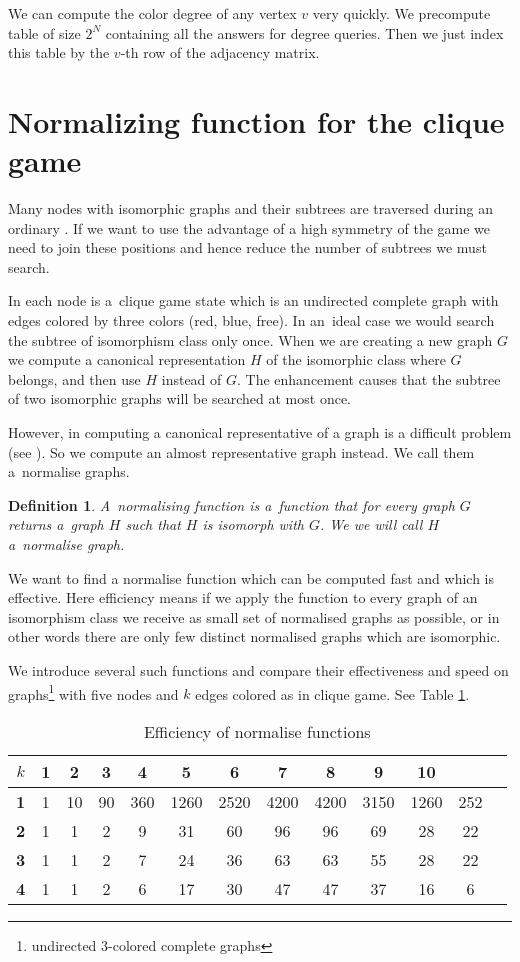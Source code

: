 We can compute the color degree of any vertex $v$ very quickly. We precompute table of size
$2^N$ containing all the answers for degree queries. Then we just index this table by
the $v$-th row of the adjacency matrix. 

\section{Normalizing function for the clique game} \label{norm} 

Many nodes with isomorphic graphs and their subtrees are traversed during an ordinary
. If we want to use the advantage of a high symmetry of the
game we need to join these positions and hence reduce the  number of subtrees we must
search.

In each node is a~clique game state which is an undirected complete graph with
edges colored by three colors (red, blue, free).
In an~ideal case we would search the subtree of isomorphism class
only once. When we are creating a new graph $G$ we compute a canonical
representation $H$ of the isomorphic class where $G$ belongs, and then use $H$ instead
of $G$. The enhancement  causes that the
subtree of two isomorphic graphs will be searched at most once.

However, in computing a canonical representative of a graph is a difficult
problem (see \cite{canonical}). So we compute an almost representative graph
instead. We call them a~normalise graphs.

\newtheorem*{norm}{Definition}	
\begin{norm}
{\sl A~normalising function} is a~function that for
every graph $G$ returns a~graph $H$ such that $H$ is isomorph with $G$. We we will call
$H$ a~{\sl normalise graph}.
\end{norm}

We want to find a normalise function which can be computed fast and which is
effective. Here efficiency means if we apply the function to every graph of an
isomorphism class we receive as small set of normalised graphs as possible, or
in other words there are only few distinct normalised graphs which are
isomorphic.

We introduce several such functions and compare their effectiveness and speed
on graphs\footnote{undirected 3-colored complete graphs} with five nodes and
$k$ edges colored as in clique game. See Table \ref{statsNorm}. 

\begin{table}
\centering
\begin{tabular}{c|c|c|c|c|c|c|c|c|c|c|c|c}
$k$&1&2&3&4&5&6&7&8&9&10\\
\hline
\textbf{1}&1&10&90&360&1260&2520&4200&4200&3150&1260&252\\
\textbf{2}&1&1&2&9&31&60&96&96&69&28&22\\
\textbf{3}&1&1&2&7&24&36&63&63&55&28&22\\
\textbf{4}&1&1&2&6&17&30&47&47&37&16&6\\
\end{tabular}
\caption{Efficiency of normalise functions}
\label{statsNorm}
\end{table}

